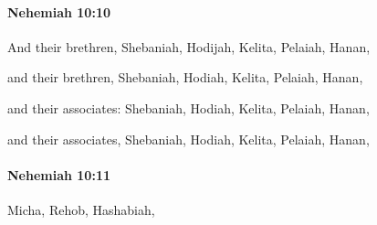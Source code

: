 		\paragraph{Nehemiah 10:10} %
			\label{NEHEMIAH-10-10}

			And their brethren, Shebaniah, Hodijah, Kelita, Pelaiah, Hanan,

			\begin{versebox}
					\item[BHS] 
					\item[LXX] 
					\item[ASV] and their brethren, Shebaniah, Hodiah, Kelita, Pelaiah, Hanan,
					\item[NIV] and their associates: Shebaniah, Hodiah, Kelita, Pelaiah, Hanan,
					\item[NRSV] and their associates, Shebaniah, Hodiah, Kelita, Pelaiah, Hanan,
			\end{versebox}

		\paragraph{Nehemiah 10:11} %
			\label{NEHEMIAH-10-11}

			Micha, Rehob, Hashabiah,

